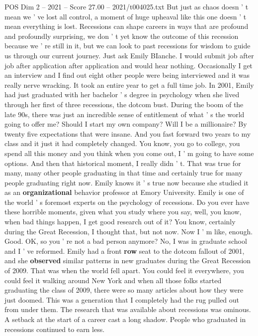 \begin{textsample}{POS Dim 2 – 2021 – Score 27.00 – 2021/t004025.txt}
But just as chaos doesn ' t mean we ' ve lost all control, a moment of huge upheaval like this one doesn ' t mean everything is lost.
Recessions can shape careers in ways that are profound and profoundly surprising, we don ' t yet know the outcome of this recession because we ' re still in it, but we can look to past recessions for wisdom to guide us through our current journey.
Just ask Emily BIanche.
I would submit job after job after application after application and would hear nothing.
Occasionally I get an interview and I find out eight other people were being interviewed and it was really nerve wracking.
It took an entire year to get a full time job.
In 2001, Emily had just graduated with her bachelor ' s degree in psychology when she lived through her first of three recessions, the dotcom bust.
During the boom of the late 90s, there was just an incredible sense of entitlement of what ' s the world going to offer me?
Should I start my own company?
Will I be a millionaire?
By twenty five expectations that were insane.
And you fast forward two years to my class and it just it had completely changed.
You know, you go to college, you spend all this money and you think when you come out, I ' m going to have some options.
And then that historical moment, I really didn ' t.
That was true for many, many other people graduating in that time and certainly true for many people graduating right now.
Emily knows it ' s true now because she studied it as an \textbf{organizational} behavior professor at Emory University.
Emily is one of the world ' s foremost experts on the psychology of recessions.
Do you ever have these horrible moments, given what you study where you say, well, you know, when bad things happen, I get good research out of it?
You know, certainly during the Great Recession, I thought that, but not now.
Now I ' m like, enough.
Good.
OK, so you ' re not a bad person anymore?
No, I was in graduate school and I ' ve reformed.
Emily had a front \textbf{row} seat to the dotcom fallout of 2001, and she \textbf{observed} similar patterns in new graduates during the Great Recession of 2009.
That was when the world fell apart.
You could feel it everywhere, you could feel it walking around New York and when all those folks started graduating the class of 2009, there were so many articles about how they were just doomed.
This was a generation that I completely had the rug pulled out from under them.
The research that was available about recessions was ominous.
A setback at the start of a career cast a long shadow.
People who graduated in recessions continued to earn less.

\end{textsample}
